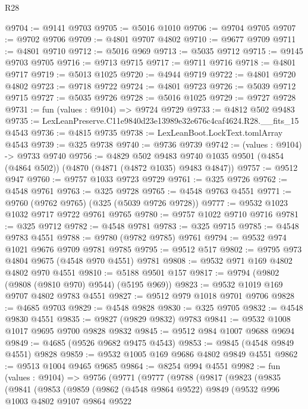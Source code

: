 \begin{lexlean}{R28}
\begin{coremodule}
@9704 := @9141 @9703
@9705 := @5016 @1010
@9706 := @9704 @9705
@9707 := @9702 @9706
@9709 := @4801 @9707 @4802
@9710 := @9677 @9709
@9711 := @4801 @9710
@9712 := @5016 @969
@9713 := @5035 @9712
@9715 := @9145 @9703 @9705
@9716 := @9713 @9715
@9717 := @9711 @9716
@9718 := @4801 @9717
@9719 := @5013 @1025
@9720 := @4944 @9719
@9722 := @4801 @9720 @4802
@9723 := @9718 @9722
@9724 := @4801 @9723
@9726 := @5039 @9712 @9715
@9727 := @5035 @9726
@9728 := @5016 @1025
@9729 := @9727 @9728
@9731 := fun (values : @9104) => @9724 @9729
@9733 := @4812 @502 @9483
@9735 := LexLeanPreserve.C11e9840d23e13989e32e676c4caf4624.R28.__fits_15 @4543
@9736 := @4815 @9735
@9738 := LexLeanBoot.LockText.tomlArray @4543
@9739 := @325 @9738
@9740 := @9736 @9739
@9742 := (values : @9104) -> @9733 @9740
@9756 := @4829
    @502
    @9483
    @9740
    @1035
    @9501
    (@4854 (@4864 @502))
    (@4870 (@4871 (@4872 @1035) @9483 @4847))
@9757 := @9512 @947
@9760 := @9757 @1033 @9723 @9729
@9761 := @325 @9726
@9762 := @4548 @9761
@9763 := @325 @9728
@9765 := @4548 @9763 @4551
@9771 := @9760 (@9762 @9765) (@325 (@5039 @9726 @9728))
@9777 := @9532 @1023 @1032 @9717 @9722 @9761 @9765
@9780 := @9757 @1022 @9710 @9716
@9781 := @325 @9712
@9782 := @4548 @9781
@9783 := @325 @9715
@9785 := @4548 @9783 @4551
@9788 := @9780 (@9782 @9785) @9761
@9794 := @9532 @974 @1021 @9676 @9709 @9781 @9785
@9795 := @9512 @517
@9802 := @9795 @973 @4804 @9675 (@4548 @970 @4551) @9781
@9808 := @9532 @971 @169 @4802 @4802 @970 @4551
@9810 := @5188 @9501 @157
@9817 := @9794 (@9802 (@9808 (@9810 @970) @9544) (@5195 @969))
@9823 := @9532 @1019 @169 @9707 @4802 @9783 @4551
@9827 := @9512 @979 @1018 @9701 @9706
@9828 := @4685 @9703
@9829 := @4548 @9828
@9830 := @325 @9705
@9832 := @4548 @9830 @4551
@9835 := @9827 (@9829 @9832) @9783
@9841 := @9532 @1008 @1017 @9695 @9700 @9828 @9832
@9845 := @9512 @984 @1007 @9688 @9694
@9849 := @4685 (@9526 @9682 @9475 @4543)
@9853 := @9845 (@4548 @9849 @4551) @9828
@9859 := @9532 @1005 @169 @9686 @4802 @9849 @4551
@9862 := @9513 @1004 @9465 @9685
@9864 := @8254 @994 @4551
@9982 := fun (values : @9104) =>
  @9756
    (@9771
      (@9777
        (@9788
          (@9817
            (@9823
              (@9835
                (@9841
                  (@9853
                    (@9859
                      (@9862
                        (@4548 @9864 @9522)
                        @9849
                        (@9532
                          @996
                          @1003
                          @4802
                          @9107
                          @9864
                          @9522

\end{coremodule}
\end{lexlean}
